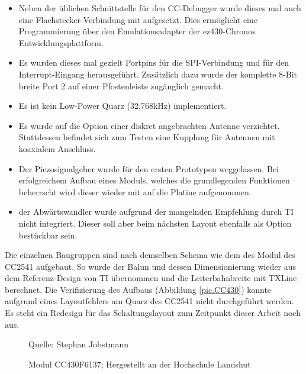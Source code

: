 \documentclass[12pt]{scrreprt} %
\begin{document}
\begin{itemize}
\item
Neben der üblichen Schnittstelle für den CC-Debugger wurde dieses mal auch eine Flachstecker-Verbindung mit aufgesetzt. Dies ermöglicht eine Programmierung über den Emulationsadapter der ez430-Chronos Entwicklungsplattform.
\item
Es wurden dieses mal gezielt Portpins für die SPI-Verbindung und für den Interrupt-Eingang herausgeführt. Zusätzlich dazu wurde der komplette 8-Bit breite Port 2 auf einer Pfostenleiste zugänglich gemacht.
\item
Es ist kein Low-Power Quarz (32,768kHz) implementiert.
\item
Es wurde auf die Option einer diskret angebrachten Antenne verzichtet. Stattdessen befindet sich zum Testen eine Kupplung für Antennen mit koaxialem Anschluss.
\item
Der Piezosignalgeber wurde für den ersten Prototypen weggelassen. Bei erfolgreichem Aufbau eines Moduls, welches die grundlegenden Funktionen beherrscht wird dieser wieder mit auf die Platine aufgenommen.
\item
der Abwärtswandler wurde aufgrund der mangelnden Empfehlung durch TI nicht integriert. Dieser soll aber beim nächsten Layout ebenfalls als Option bestückbar sein.
\end{itemize}
Die einzelnen Baugruppen sind nach demselben Schema wie dem des Modul des CC2541 aufgebaut. So wurde der Balun und dessen Dimensionierung wieder aus dem Referenz-Design von TI übernommen und die Leiterbahnbreite mit TXLine berechnet. 
Die Verifizierung des Aufbaus (Abbildung \vref{pic.CC430}) konnte aufgrund eines Layoutfehlers am Quarz des CC2541 nicht durchgeführt werden. Es steht ein Redesign für das Schaltungslayout zum Zeitpunkt dieser Arbeit noch aus. 
\begin{figure}
\centering
\caption{Modul CC430F6137; Hergestellt an der Hochschule Landshut}
Quelle: Stephan Jobstmann
\label{pic.CC430}
\end{figure}
\end{document}
